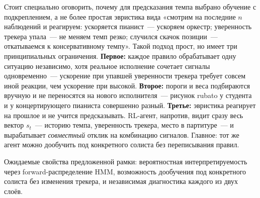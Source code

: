 \documentclass[%
  aps,pre,
  superscriptaddress,
  longbibliography,nofootinbib,
  showkeys,
  amsmath,amssymb,floatfix
]{revtex4-2}
\begin{document}
Стоит специально оговорить, почему для предсказания темпа выбрано
обучение с подкреплением, а не более простая эвристика вида
«смотрим на последние $n$ наблюдений и реагируем: ускоряется
пианист~--- ускоряем оркестр; уверенность трекера упала~--- не
меняем темп резко; случился скачок позиции~--- откатываемся к
консервативному темпу». Такой подход прост, но имеет три
принципиальных ограничения. \textbf{Первое:} каждое правило
обрабатывает одну ситуацию независимо, хотя реальное исполнение
сочетает сигналы одновременно~--- ускорение при упавшей
уверенности трекера требует совсем иной реакции, чем ускорение
при высокой. \textbf{Второе:} пороги и веса подбираются вручную
и не переносятся на нового исполнителя~--- рисунок rubato у
студента и у концертирующего пианиста совершенно разный.
\textbf{Третье:} эвристика реагирует на прошлое и не учится
предсказывать. RL-агент, напротив, видит сразу весь вектор
$s_t$~--- историю темпа, уверенность трекера, место в
партитуре~--- и вырабатывает \textit{совместный} отклик на
комбинацию сигналов. Главное: тот же агент можно дообучить под
конкретного солиста без переписывания правил.

Ожидаемые свойства предложенной рамки: вероятностная
интерпретируемость через forward-распределение HMM, возможность
дообучения под конкретного солиста без изменения трекера,
и независимая диагностика каждого из двух слоёв.
\end{document}
